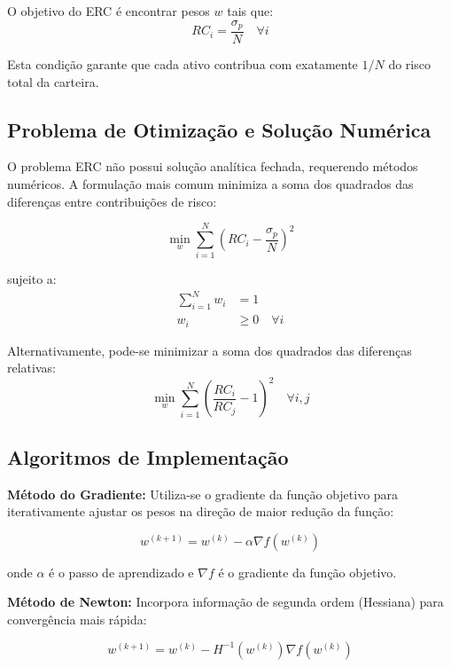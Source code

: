 O objetivo do ERC é encontrar pesos $w$ tais que:
\begin{equation}
RC_i = \frac{\sigma_p}{N} \quad \forall i
\end{equation}

Esta condição garante que cada ativo contribua com exatamente $1/N$ do risco total da carteira.

\subsection{Problema de Otimização e Solução Numérica}

O problema ERC não possui solução analítica fechada, requerendo métodos numéricos. A formulação mais comum minimiza a soma dos quadrados das diferenças entre contribuições de risco:

\begin{equation}
\min_w \sum_{i=1}^{N} \left(RC_i - \frac{\sigma_p}{N}\right)^2
\end{equation}

sujeito a:
\begin{align}
\sum_{i=1}^{N} w_i &= 1 \\
w_i &\geq 0 \quad \forall i
\end{align}

Alternativamente, pode-se minimizar a soma dos quadrados das diferenças relativas:
\begin{equation}
\min_w \sum_{i=1}^{N} \left(\frac{RC_i}{RC_j} - 1\right)^2 \quad \forall i,j
\end{equation}

\subsection{Algoritmos de Implementação}

\textbf{Método do Gradiente:} Utiliza-se o gradiente da função objetivo para iterativamente ajustar os pesos na direção de maior redução da função:

\begin{equation}
w^{(k+1)} = w^{(k)} - \alpha \nabla f(w^{(k)})
\end{equation}

onde $\alpha$ é o passo de aprendizado e $\nabla f$ é o gradiente da função objetivo.

\textbf{Método de Newton:} Incorpora informação de segunda ordem (Hessiana) para convergência mais rápida:

\begin{equation}
w^{(k+1)} = w^{(k)} - H^{-1}(w^{(k)}) \nabla f(w^{(k)})
\end{equation}

